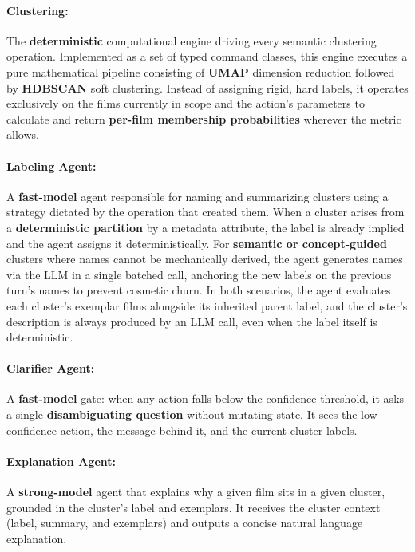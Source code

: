 \paragraph{Clustering:} The \textbf{deterministic} computational engine driving every semantic clustering operation.
Implemented as a set of typed command classes, this engine executes a pure mathematical pipeline consisting of \textbf{UMAP} dimension reduction followed by \textbf{HDBSCAN} soft clustering.
Instead of assigning rigid, hard labels, it operates exclusively on the films currently in scope and the action's parameters to calculate and return \textbf{per-film membership probabilities} wherever the metric allows.

\paragraph{Labeling Agent:} A \textbf{fast-model} agent responsible for naming and summarizing clusters using a strategy dictated by the operation that created them.
When a cluster arises from a \textbf{deterministic partition} by a metadata attribute, the label is already implied and the agent assigns it deterministically.
For \textbf{semantic or concept-guided} clusters where names cannot be mechanically derived, the agent generates names via the LLM in a single batched call, anchoring the new labels on the previous turn's names to prevent cosmetic churn.
In both scenarios, the agent evaluates each cluster's exemplar films alongside its inherited parent label, and the cluster's description is always produced by an LLM call, even when the label itself is deterministic. 

\paragraph{Clarifier Agent:} A \textbf{fast-model} gate: when any action falls below the confidence threshold, it asks a single \textbf{disambiguating question} without mutating state.
It sees the low-confidence action, the message behind it, and the current cluster labels.

\paragraph{Explanation Agent:} A \textbf{strong-model} agent that explains why a given film sits in a given cluster, grounded in the cluster's label and exemplars.
It receives the cluster context (label, summary, and exemplars) and outputs a concise natural language explanation.

